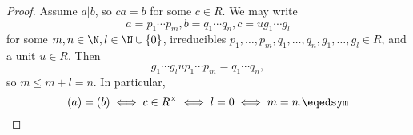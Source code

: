 \documentclass[pmath347]{subfiles}
\begin{document}
    \begin{proof}
        Assume $a|b$, so $ca=b$ for some $c\in R$. We may write
        \begin{equation*}
            a = p_1\cdots p_m, b=q_1\cdots q_n, c = ug_1\cdots g_l
        \end{equation*}
        for some $m,n\in\N, l\in\N\cup\left\lbrace 0 \right\rbrace$, irreducibles $p_1,\ldots,p_m,q_1,\ldots,q_n,g_1,\ldots,g_l\in R$, and a unit $u\in R$. Then
        \begin{equation*}
            g_1\cdots g_lup_1\cdots p_m = q_1\cdots q_n,
        \end{equation*}
        so $m\leq m+l = n$. In particular, 
        \begin{equation*}
            \left( a \right) = \left( b \right) \iff c\in R^\times \iff l=0 \iff m=n. \eqedsym
        \end{equation*}
    \end{proof}
\end{document}
